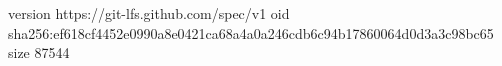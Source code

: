 version https://git-lfs.github.com/spec/v1
oid sha256:ef618cf4452e0990a8e0421ca68a4a0a246cdb6c94b17860064d0d3a3c98bc65
size 87544
